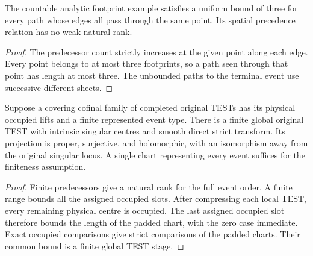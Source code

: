 \begin{proposition}
\label{hir:g8-fixed-point-height-obstruction}
\leanok
The countable analytic footprint example satisfies a uniform
bound of three for every path whose edges all pass through the
same point. Its spatial precedence relation has no weak natural
rank.
\end{proposition}
\begin{proof}
The predecessor count strictly increases at the given point
along each edge. Every point belongs to at most three
footprints, so a path seen through that point has length at
most three. The unbounded paths to the terminal event use
successive different sheets.
\end{proof}

\begin{theorem}
\label{hir:g8-finite-cofinal-event-endpoint}
\leanok
Suppose a covering cofinal family of completed original TESTs has
its physical occupied lifts and a finite represented event type.
There is a finite global original TEST with intrinsic singular
centres and smooth direct strict transform. Its projection is
proper, surjective, and holomorphic, with an isomorphism away
from the original singular locus. A single chart representing
every event suffices for the finiteness assumption.
\end{theorem}
\begin{proof}
Finite predecessors give a natural rank for the full event order.
A finite range bounds all the assigned occupied slots. After
compressing each local TEST, every remaining physical centre is
occupied. The last assigned occupied slot therefore bounds the
length of the padded chart, with the zero case immediate. Exact
occupied comparisons give strict comparisons of the padded
charts. Their common bound is a finite global TEST stage.
\end{proof}

